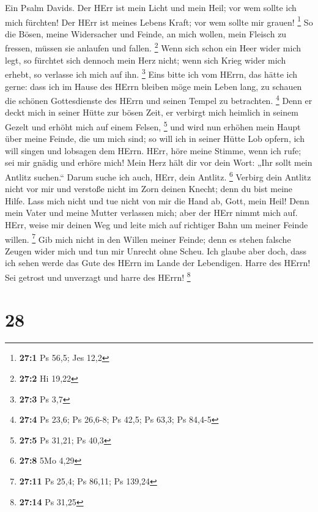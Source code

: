 Ein Psalm Davids. Der HErr ist mein Licht und mein Heil;
vor wem sollte ich mich fürchten! Der HErr ist meines Lebens Kraft; vor
wem sollte mir grauen! \footnote{\textbf{27:1} Ps 56,5; Jes 12,2}
 So die Bösen, meine Widersacher und Feinde, an mich wollen,
mein Fleisch zu fressen, müssen sie anlaufen und fallen. \footnote{\textbf{27:2}
  Hi 19,22}  Wenn sich schon ein Heer wider mich legt, so
fürchtet sich dennoch mein Herz nicht; wenn sich Krieg wider mich
erhebt, so verlasse ich mich auf ihn. \footnote{\textbf{27:3} Ps 3,7}
 Eins bitte ich vom HErrn, das hätte ich gerne: dass ich im
Hause des HErrn bleiben möge mein Leben lang, zu schauen die schönen
Gottesdienste des HErrn und seinen Tempel zu betrachten. \footnote{\textbf{27:4}
  Ps 23,6; Ps 26,6-8; Ps 42,5; Ps 63,3; Ps 84,4-5}  Denn er
deckt mich in seiner Hütte zur bösen Zeit, er verbirgt mich heimlich in
seinem Gezelt und erhöht mich auf einem Felsen, \footnote{\textbf{27:5}
  Ps 31,21; Ps 40,3}  und wird nun erhöhen mein Haupt über
meine Feinde, die um mich sind; so will ich in seiner Hütte Lob opfern,
ich will singen und lobsagen dem HErrn.  HErr, höre meine
Stimme, wenn ich rufe; sei mir gnädig und erhöre mich!  Mein
Herz hält dir vor dein Wort: „Ihr sollt mein Antlitz suchen.`` Darum
suche ich auch, HErr, dein Antlitz. \footnote{\textbf{27:8} 5Mo 4,29}
 Verbirg dein Antlitz nicht vor mir und verstoße nicht im
Zorn deinen Knecht; denn du bist meine Hilfe. Lass mich nicht und tue
nicht von mir die Hand ab, Gott, mein Heil!  Denn mein
Vater und meine Mutter verlassen mich; aber der HErr nimmt mich auf.
 HErr, weise mir deinen Weg und leite mich auf richtiger
Bahn um meiner Feinde willen. \footnote{\textbf{27:11} Ps 25,4; Ps
  86,11; Ps 139,24}  Gib mich nicht in den Willen meiner
Feinde; denn es stehen falsche Zeugen wider mich und tun mir Unrecht
ohne Scheu.  Ich glaube aber doch, dass ich sehen werde das
Gute des HErrn im Lande der Lebendigen.  Harre des HErrn!
Sei getrost und unverzagt und harre des HErrn! \footnote{\textbf{27:14}
  Ps 31,25}

\hypertarget{section-13}{%
\section{28}\label{section-13}}

